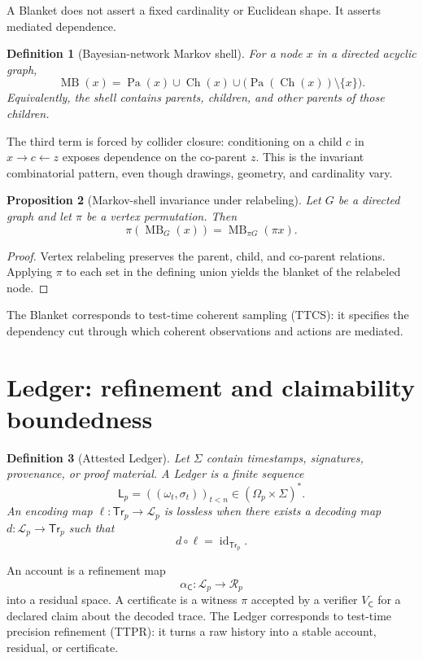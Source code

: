 \documentclass[11pt]{article}
\newtheorem{definition}{Definition}[section]
\newtheorem{proposition}[definition]{Proposition}
\newcommand{\Contract}{\mathsf{C}}
\newcommand{\Ledger}{\mathsf{L}}
\newcommand{\Tr}{\mathsf{Tr}}
\newcommand{\Pa}{\operatorname{Pa}}
\newcommand{\Ch}{\operatorname{Ch}}
\newcommand{\id}{\operatorname{id}}
\begin{document}
A Blanket does not assert a fixed cardinality or Euclidean shape. It asserts mediated dependence.

\begin{definition}[Bayesian-network Markov shell]
For a node $x$ in a directed acyclic graph,
\[
\operatorname{MB}(x)
=
\Pa(x)\cup\Ch(x)\cup
\bigl(\Pa(\Ch(x))\setminus\{x\}\bigr).
\]
Equivalently, the shell contains parents, children, and other parents of those children.
\end{definition}

The third term is forced by collider closure: conditioning on a child $c$ in $x\to c\leftarrow z$ exposes dependence on the co-parent $z$. This is the invariant combinatorial pattern, even though drawings, geometry, and cardinality vary.

\begin{proposition}[Markov-shell invariance under relabeling]
Let $G$ be a directed graph and let $\pi$ be a vertex permutation. Then
\[
\pi(\operatorname{MB}_G(x))
=
\operatorname{MB}_{\pi G}(\pi x).
\]
\end{proposition}

\begin{proof}
Vertex relabeling preserves the parent, child, and co-parent relations. Applying $\pi$ to each set in the defining union yields the blanket of the relabeled node.
\end{proof}

The Blanket corresponds to test-time coherent sampling (TTCS): it specifies the dependency cut through which coherent observations and actions are mediated.

\section{Ledger: refinement and claimability boundedness}

\begin{definition}[Attested Ledger]
Let $\Sigma$ contain timestamps, signatures, provenance, or proof material. A Ledger is a finite sequence
\[
\Ledger_p=((\omega_t,\sigma_t))_{t<n}\in(\Omega_p\times\Sigma)^*.
\]
An encoding map $\ell:\Tr_p\to\mathcal L_p$ is lossless when there exists a decoding map $d:\mathcal L_p\to\Tr_p$ such that
\[
d\circ\ell=\id_{\Tr_p}.
\]
\end{definition}

An account is a refinement map
\[
\alpha_{\Contract}:\mathcal L_p\to\mathcal R_p
\]
into a residual space. A certificate is a witness $\pi$ accepted by a verifier $V_{\Contract}$ for a declared claim about the decoded trace. The Ledger corresponds to test-time precision refinement (TTPR): it turns a raw history into a stable account, residual, or certificate.
\end{document}
